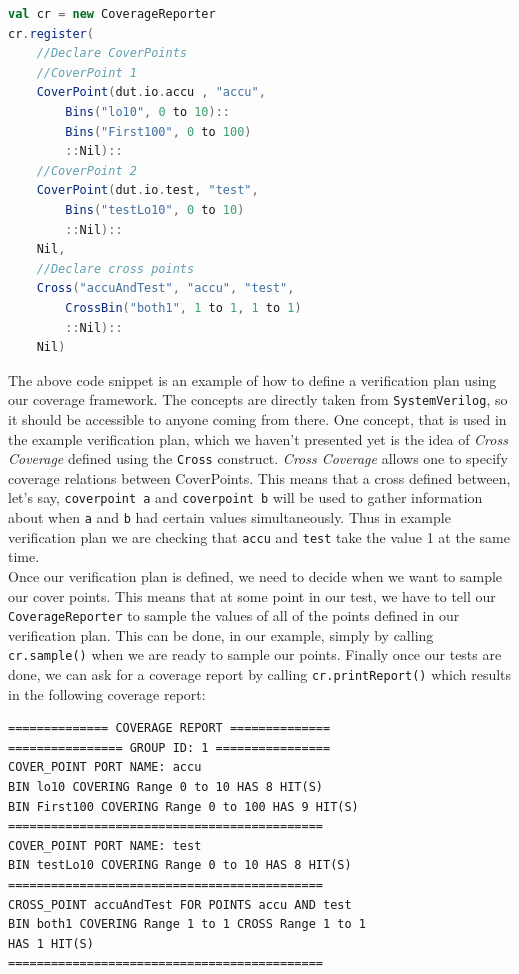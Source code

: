 \documentclass[conference]{IEEEtran}
\begin{document}
\begin{lstlisting}[language=scala]
val cr = new CoverageReporter
cr.register(
    //Declare CoverPoints
    //CoverPoint 1
    CoverPoint(dut.io.accu , "accu",
        Bins("lo10", 0 to 10)::
        Bins("First100", 0 to 100)
        ::Nil)::
    //CoverPoint 2
    CoverPoint(dut.io.test, "test", 
        Bins("testLo10", 0 to 10)
        ::Nil)::
    Nil,
    //Declare cross points
    Cross("accuAndTest", "accu", "test",
        CrossBin("both1", 1 to 1, 1 to 1)
        ::Nil)::
    Nil)
\end{lstlisting}
The above code snippet is an example of how to define a verification plan using our coverage framework. The concepts are directly taken from \texttt{SystemVerilog}, so it should be accessible to anyone coming from there. One concept, that is used in the example verification plan, which we haven't presented yet is the idea of \textit{Cross Coverage} defined using the \texttt{Cross} construct. \textit{Cross Coverage} allows one to specify coverage relations between CoverPoints. This means that a cross defined between, let's say, \texttt{coverpoint a} and \texttt{coverpoint b} will be used to gather information about when \texttt{a} and \texttt{b} had certain values simultaneously. Thus in example verification plan we are checking that \texttt{accu} and \texttt{test} take the value 1 at the same time.\\
Once our verification plan is defined, we need to decide when we want to sample our cover points. This means that at some point in our test, we have to tell our \texttt{CoverageReporter} to sample the values of all of the points defined in our verification plan. This can be done, in our example, simply by calling \texttt{cr.sample()} when we are ready to sample our points. Finally once our tests are done, we can ask for a coverage report by calling \texttt{cr.printReport()} which results in the following coverage report: 
\begin{verbatim}
============== COVERAGE REPORT ==============
================ GROUP ID: 1 ================
COVER_POINT PORT NAME: accu
BIN lo10 COVERING Range 0 to 10 HAS 8 HIT(S)
BIN First100 COVERING Range 0 to 100 HAS 9 HIT(S)
============================================
COVER_POINT PORT NAME: test
BIN testLo10 COVERING Range 0 to 10 HAS 8 HIT(S)
============================================
CROSS_POINT accuAndTest FOR POINTS accu AND test
BIN both1 COVERING Range 1 to 1 CROSS Range 1 to 1 
HAS 1 HIT(S)
============================================
\end{verbatim}
\end{document}
